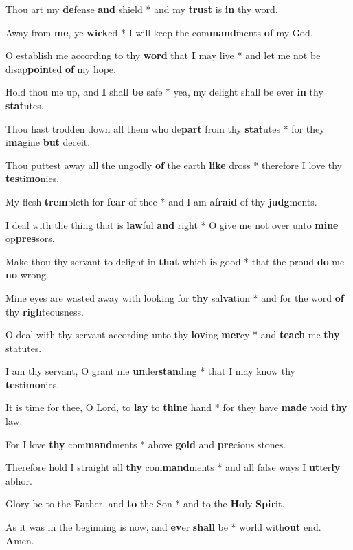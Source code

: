 \begin{multicols}{2}
	Thou art my \textbf{de}fense \textbf{and} shield * and my \textbf{trust} is \textbf{in} thy word.
	
	Away from \textbf{me}, ye \textbf{wick}ed * I will keep the com\textbf{mand}ments \textbf{of} my God.
	
	O establish me according to thy \textbf{word} that \textbf{I} may live * and let me not be disap\textbf{poin}ted \textbf{of} my hope.
	
	Hold thou me up, and \textbf{I} shall \textbf{be} safe * yea, my delight shall be ever \textbf{in} thy \textbf{stat}utes.
	
	Thou hast trodden down all them who de\textbf{part} from thy \textbf{stat}utes * for they i\textbf{ma}gine \textbf{but} deceit.
	
	Thou puttest away all the ungodly \textbf{of} the earth \textbf{like} dross * therefore I love thy \textbf{tes}ti\textbf{mo}nies.
	
	My flesh \textbf{trem}bleth for \textbf{fear} of thee * and I am a\textbf{fraid} of thy \textbf{judg}ments.
	
	I deal with the thing that is \textbf{law}ful \textbf{and} right * O give me not over unto \textbf{mine} op\textbf{pres}sors.
	
	Make thou thy servant to delight in \textbf{that} which \textbf{is} good * that the proud \textbf{do} me \textbf{no} wrong.
	
	Mine eyes are wasted away with looking for \textbf{thy} sal\textbf{va}tion * and for the word \textbf{of} thy \textbf{righ}teousness.
	
	O deal with thy servant according unto thy \textbf{lov}ing \textbf{mer}cy * and \textbf{teach} me \textbf{thy} statutes.
	
	I am thy servant, O grant me \textbf{un}der\textbf{stan}ding * that I may know thy \textbf{tes}ti\textbf{mo}nies.
	
	It is time for thee, O Lord, to \textbf{lay} to \textbf{thine} hand * for they have \textbf{made} void \textbf{thy} law.
	
	For I love \textbf{thy} com\textbf{mand}ments * above \textbf{gold} and \textbf{pre}cious stones.
	
	Therefore hold I straight all \textbf{thy} com\textbf{mand}ments * and all false ways I \textbf{ut}ter\textbf{ly} abhor. 
	
	Glory be to the \textbf{Fa}ther, and \textbf{to} the Son * and to the \textbf{Ho}ly \textbf{Spir}it.
	
	As it was in the beginning is now, and \textbf{ev}er \textbf{shall} be * world with\textbf{out} end. \textbf{A}men.
\end{multicols}